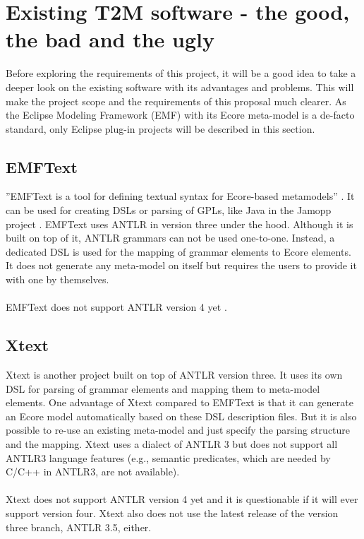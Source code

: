 \section{Existing T2M software - the good, the bad and the ugly}

Before exploring the requirements of this project, it will be a good idea to 
take a deeper look on the existing software with its advantages and 
problems. This will make the project scope and the requirements of this
proposal much clearer.
As the Eclipse Modeling Framework (EMF) with its Ecore meta-model is
a de-facto standard, only Eclipse plug-in projects will be described in this
section.

\subsection{EMFText}
''EMFText is a tool for defining textual syntax for Ecore-based metamodels''
\cite{Heidenreich2011model}.
It can be used for creating DSLs or parsing of GPLs, like Java in the Jamopp project
\cite{Heidenreich2009closing}.
EMFText uses ANTLR in version three under the hood.
Although it is built on top of it, ANTLR grammars can not be used one-to-one.
Instead, a dedicated DSL is used for the mapping of grammar elements to Ecore
elements.
It does not generate any
meta-model on itself but requires the users to provide it with one by themselves.
\\ \ \\
EMFText does not support ANTLR version 4 yet \cite{ANTLR4_EMFText}.

\subsection{Xtext}
Xtext\cite{Bettini2013implementing} is another project built on top of ANTLR version three.
It uses its own DSL for parsing of grammar elements and mapping them to meta-model elements.
One advantage of Xtext compared to EMFText is that it can generate an Ecore model automatically
based on these DSL description files. But it is also possible to re-use an existing meta-model
and just specify the parsing structure and the mapping. Xtext uses a dialect of ANTLR 3 but does 
not support all ANTLR3 language features (e.g., semantic predicates, which are needed
by C/C++ in ANTLR3, are not available).
\\ \ \\
Xtext does not support ANTLR version 4 yet \cite{ANTLR4_XText} and it is questionable
if it will ever support version four.
Xtext also does not use the latest release of the version three
branch, ANTLR 3.5, either. 

